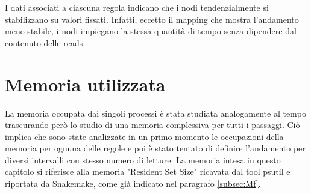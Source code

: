 \begin{table}[H]
\centering
{}
\caption{Media e deviazione standard, espresse in secondi(s), dei tempi di esecuzione delle regole su diversi subset da centomila reads.}
\label{varT}
\end{table}

I dati associati a ciascuna regola indicano che i nodi tendenzialmente si stabilizzano su valori fissati.
Infatti, eccetto il mapping che mostra l'andamento meno stabile, i nodi impiegano la stessa quantità di tempo senza dipendere dal contenuto delle reads. 


\section{Memoria utilizzata}
La memoria occupata dai singoli processi è stata studiata analogamente al tempo trascurando però lo studio di una memoria complessiva per tutti i passaggi. 
Ciò implica che sono state analizzate in un primo momento le occupazioni della memoria per ognuna delle regole e poi è stato tentato di definire l'andamento per diversi intervalli con stesso numero di letture.
La memoria intesa in questo capitolo si riferisce alla memoria "Resident Set Size" ricavata dal tool psutil e riportata da Snakemake, come già indicato nel paragrafo \ref{subsec:Mf}. 

